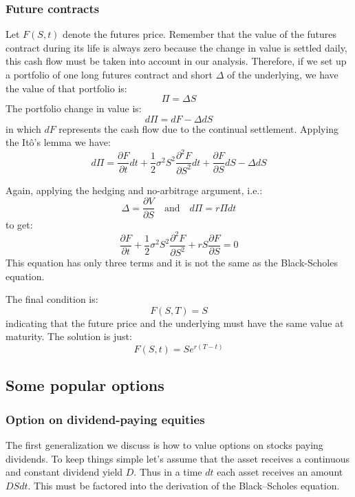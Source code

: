 \subsubsection{Future contracts}
Let $F(S,t)$ denote the futures price. Remember that the value of the futures contract during its life is always zero because the change in value is settled daily, this cash flow must be taken into account in our analysis. Therefore, if we set up a portfolio of one long futures contract and short $\Delta$ of the underlying, we have the value of that portfolio is:
\begin{equation}
    \Pi = \Delta S
\end{equation}
The portfolio change in value is:
\begin{equation}
    d\Pi = dF - \Delta dS
\end{equation}
in which $dF$ represents the cash flow due to the continual settlement. Applying the Itô's lemma we have:
\begin{equation}
    d\Pi = \frac{\partial F}{\partial t} dt + \frac{1}{2} \sigma^2 S^2 \frac{\partial^2 F}{\partial S^2} dt + \frac{\partial F}{\partial S} dS - \Delta dS
\end{equation}

Again, applying the hedging and no-arbitrage argument, i.e.:
\begin{equation}
    \Delta = \frac{\partial V}{\partial S} \quad \text{and} \quad d\Pi = r \Pi dt
\end{equation}
to get:
\begin{equation}
    \frac{\partial F}{\partial t} + \frac{1}{2} \sigma^2 S^2 \frac{\partial^2 F}{\partial S^2} + r S \frac{\partial F}{\partial S} = 0
\end{equation}
This equation has only three terms and it is not the same as the Black-Scholes equation.

The final condition is:
\begin{equation}
    F(S,T) = S
\end{equation}
indicating that the future price and the underlying must have the same value at maturity. The solution is just:
\begin{equation}
    F(S,t) = S e^{r(T-t)}
\end{equation}



\subsection{Some popular options}
\subsubsection{Option on dividend-paying equities}
The first generalization we discuss is how to value options on stocks paying dividends. To keep things simple let's assume that the asset receives a continuous and constant dividend yield $D$. Thus in a time $dt$ each asset receives an amount $DS dt$. This must be factored into the derivation of the Black–Scholes equation. 

